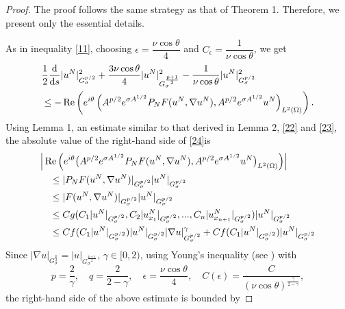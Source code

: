 \documentclass[12pt]{article}
\theoremstyle{plain}
\theoremstyle{remark}
\newcommand{\dd}{\mathrm{d}}
\newcommand{\Gspace}{G_\sigma^{p/2}}
\begin{document}
\begin{proof}
The proof follows the same strategy as that of Theorem 1. Therefore, we present only the essential details.

As in inequality \eqref{11}, choosing $\epsilon=\dfrac{\nu\cos\theta}{4}$ and $C_{\epsilon}=\dfrac{1}{\nu\cos\theta}$, we get
\begin{align}
& \frac{1}{2} \frac{\dd}{\dd s} |u^N|_{G_\sigma^{p/2}}^2 + \frac{3\nu \cos\theta}{4}|u^N|_{G_\sigma^{\frac{p+1}{2}}}^2 -\frac{1}{\nu \cos\theta}|u^N|_{
G_\sigma^{p/2}
}^2 \notag \\
&\leq -\operatorname{Re}\left( e^{i\theta}
\left( A^{p/2} e^{\sigma A^{1/2}} P_N F(u^N,\nabla u^N), A^{p/2} e^{\sigma A^{1/2}} u^N\right)_ {L^2(\Omega)}\right).\label{24}
\end{align} 
Using Lemma 1, an estimate similar to that derived in Lemma 2, \eqref{22} and \eqref{23}, the absolute value of the right-hand side of \eqref{24}is
\begin{align*}
&\Big| \operatorname{Re}\Big( e^{i\theta} \big( A^{p/2} e^{\sigma A^{1/2}} P_N F(u^N,\nabla u^N), A^{p/2} e^{\sigma A^{1/2}} u^N \big)_{L^2(\Omega)} \Big) \Big|
\notag \\
&\quad\leq  |P_NF(u^N,\nabla u^N)|_{\Gspace}|u^N|_{\Gspace}\notag \\
&\quad \leq  |F(u^N,\nabla u^N)|_{\Gspace}|u^N|_{\Gspace}\notag \\ &\quad  \leq C g(C_1 |u^N|_{\Gspace},C_2 |u^N_{x_1}|_{\Gspace},...,C_n |u^N_{x_{n+1}}|_{\Gspace})|u^N|_{\Gspace}
\notag \\ &\quad \leq  Cf(C_1 |u^N|_{\Gspace})|u^N|_{\Gspace}|\nabla u|^\gamma_{\Gspace}+ C  f(C_1 |u^N|_{\Gspace})|u^N|_{\Gspace}  
\end{align*}
Since $|\nabla u|_{G_{\sigma}^{\frac{p}{2}}}=| u|_{G_{\sigma}^{\frac{p+1}{2}}}$, $\gamma\in[0,2)$, using Young's inequality (see \cite{RobinsonRodrigoSadowski2016}) with  \[p=\dfrac{2}{\gamma},\quad q=\dfrac{2}{2-\gamma},\quad \epsilon=\dfrac{\nu \cos\theta}{4}, \quad C(\epsilon)=\dfrac{C}{(\nu \cos\theta)^{\frac{\gamma}{2-\gamma}}},\] the right-hand side of the above estimate is bounded by


\end{proof}
\end{document}
